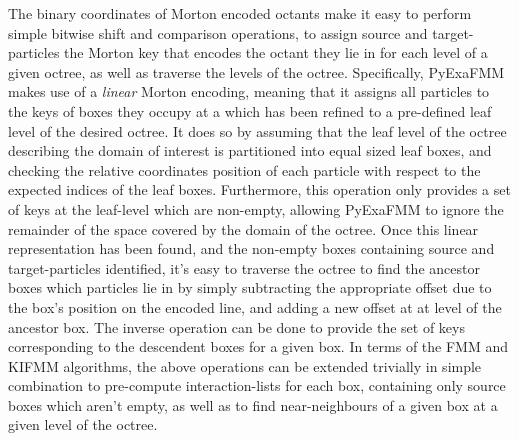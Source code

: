 The binary coordinates of Morton encoded octants make it easy to perform simple
bitwise shift and comparison operations, to assign source and \gls{target-particles} the Morton key
that encodes the octant they lie in for each level of a given octree, as well as traverse the levels of
the octree. Specifically, \gls{PyExaFMM} makes use of a \textit{linear} Morton encoding, meaning that it assigns
all particles to the keys of boxes they occupy at a which has been refined to a
pre-defined leaf level of the desired octree. It does so by assuming that the
leaf level of the octree describing the domain of interest is partitioned into equal
sized leaf boxes, and checking the relative coordinates position of each particle
with respect to the expected indices of the leaf boxes. Furthermore, this operation only provides
a set of keys at the leaf-level which are non-empty, allowing \gls{PyExaFMM} to
ignore the remainder of the space covered by the domain of the octree. Once this
linear representation has been found, and the non-empty boxes containing
source and \gls{target-particles} identified, it's easy to traverse the octree
to find the ancestor boxes which particles lie in by simply subtracting the appropriate
offset due to the box's position on the encoded line, and adding a new offset at
at level of the ancestor box. The inverse operation can be done to provide the set
of keys corresponding to the descendent boxes for a given box. In terms of the
\gls{FMM} and \gls{KIFMM} algorithms, the above operations can be extended trivially
in simple combination to pre-compute \gls{interaction-list}s for each box, containing
only source boxes which aren't empty, as well as to find \gls{near-neighbours} of
a given box at a given level of the octree.

